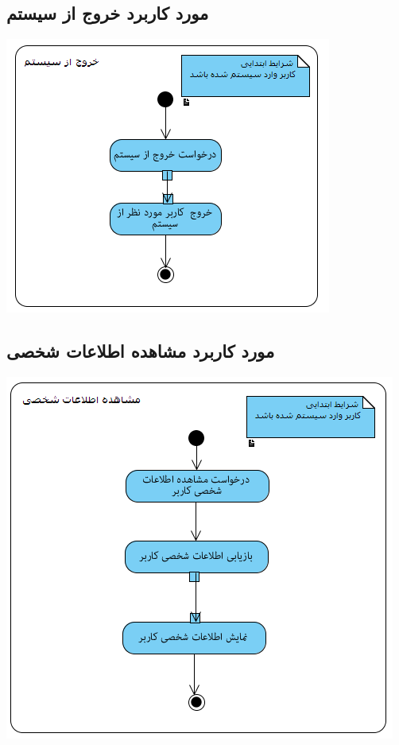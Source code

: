\newpage
\vspace{2cm}
\subsection*{مورد کاربرد خروج از سیستم}
\vspace{2cm}
\begin{center}
\includegraphics[width=\textwidth]{ActivityDiagrams/14.png}
\end{center}

\newpage
\vspace{2cm}
\subsection*{مورد کاربرد مشاهده اطلاعات شخصی}
\vspace{2cm}
\begin{center}
\includegraphics[width=\textwidth]{ActivityDiagrams/15.png}
\end{center}

